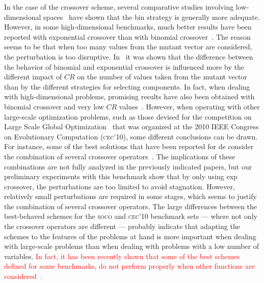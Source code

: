 \documentclass[preprint,3p]{elsarticle}
\newcommand{\DE}{{\sc de}}
\begin{document}
In the case of the crossover scheme, several comparative
studies involving low-dimensional spaces~\cite{Mezura-Montes:06} have shown
that the bin strategy is generally more adequate.
%
%
%
However, in some high-dimensional benchmarks, much better results have been reported
with exponential crossover than with binomial crossover~\cite{LaTorre:11}.
%
The reason seems to be that when too many values from the mutant vector are considered, the perturbation is too disruptive.
%
In~\cite{Zaharie:09} it was shown that the difference between the behavior of binomial
and exponential crossover is influenced more by the different impact of $CR$
on the number of values taken from the mutant vector than by the different strategies for selecting components.
%
In fact, when dealing with high-dimensional problems, promising results have also been obtained with binomial crossover and very low $CR$ values~\cite{Olguin:13}.
%
However, when operating with other large-scale optimization problems, such as those devised for the
competition on Large Scale Global Optimization~\cite{Tang:10} that was organized at the 2010 IEEE Congress on Evolutionary Computation (\textsc{cec'10}),
some different conclusions can be drawn.
%
For instance, some of the best solutions that have been reported for \DE{} consider the combination of several crossover operators~\cite{Wang:10,Brest:12}.
%
The implications of these combinations are not fully analyzed in the previously indicated papers, but our preliminary experiments with this benchmark show that
by only using exp crossover, the perturbations are too limited to avoid stagnation.
%
However, relatively small perturbations are required in some stages, which seems to justify the combination of several crossover operators.
%
The large differences between the best-behaved schemes for the \textsc{soco} and \textsc{cec'10} benchmark sets --- where not only the 
crossover operators are different ---
%
probably indicate that adapting the schemes to the features of
the problems at hand is more important when dealing with large-scale problems than when dealing with problems with a low number of
variables.
%
\textcolor{red}{
In fact, it has been recently shown that some of the best schemes defined for some benchmarks, do not perform properly when other functions
are considered~\cite{LaTorre:14}.
}
\end{document}

